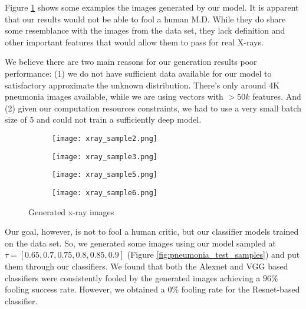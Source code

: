 Figure \ref{fig:xray_results} shows some examples the images generated by our model. It is apparent that our results would not be able to fool a human M.D. While they do share some resemblance with the images from the data set, they lack definition and other important features that would allow them to pass for real X-rays.

We believe there are two main reasons for our generation results poor performance: (1) we do not have sufficient data available for our model to satisfactory approximate the unknown distribution. There's only around 4K pneumonia images available, while we are using vectors with $> 50k$ features. And (2) given our computation resources constraints, we had to use a very small batch size of 5 and could not train a sufficiently deep model.

\begin{figure}[htbp!]
     \centering
     \begin{subfigure}[b]{0.3\textwidth}
         \centering
         \texttt{[image: xray\_sample2.png]}
     \end{subfigure}
     \hfill
     \begin{subfigure}[b]{0.3\textwidth}
         \centering
         \texttt{[image: xray\_sample3.png]}
     \end{subfigure}
     \hfill
     \begin{subfigure}[b]{0.3\textwidth}
         \centering
         \texttt{[image: xray\_sample5.png]}
     \end{subfigure}
     \hfill
     \begin{subfigure}[b]{0.3\textwidth}
         \centering
         \texttt{[image: xray\_sample6.png]}
     \end{subfigure}
     \caption{Generated x-ray images}
     \label{fig:xray_results}
\end{figure}

Our goal, however, is not to fool a human critic, but our classifier models trained on the data set. So, we generated some images using our model sampled at $\tau = [0.65, 0.7, 0.75, 0.8, 0.85, 0.9]$ (Figure \ref{fig:pneumonia_test_samples}) and put them through our classifiers. We found that both the Alexnet and VGG based classifiers were consistently fooled by the generated images achieving a $96\%$ fooling success rate. However, we obtained a $0\%$ fooling rate for the Resnet-based classifier. 


